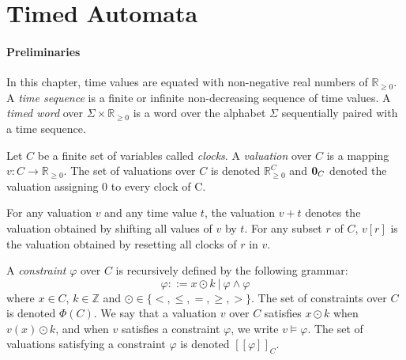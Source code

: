 \documentclass[11pt]{article}
\theoremstyle{definition}
\theoremstyle{remark}
\theoremstyle{definition}
\begin{document}
\section{Timed Automata}\label{sec:ta}
\paragraph{Preliminaries}\label{par:prelims}
In this chapter, time values are equated with non-negative real numbers of $\mathbb{R}_{\geq 0}$. A \emph{time sequence} is a finite or infinite non-decreasing sequence of time values.
A \emph{timed word} over $\Sigma \times \mathbb{R}_{\geq 0}$ is a word over the alphabet $\Sigma$ sequentially paired with a time sequence.

Let $C$ be a finite set of variables called \emph{clocks}. A \emph{valuation} over $C$ is a mapping $v \colon C \to \mathbb{R}_{\geq 0}$. The set of valuations over $C$ is denoted $\mathbb{R}_{\geq 0}^C$ and $\text{\bf 0}_C$ denoted the valuation assigning 0 to every clock of C.

For any valuation $v$ and any time value $t$, the valuation $v + t$ denotes the valuation obtained by shifting all values of $v$ by $t$. For any subset $r$ of $C$, $v[r]$ is the valuation obtained by resetting all clocks of $r$ in $v$.

A \emph{constraint} $\varphi$ over $C$ is recursively defined by the following grammar:
\begin{equation*}
	\varphi ::= x \odot k\ |\ \varphi \land \varphi
\end{equation*}
where $x\in C$, $k \in \mathbb{Z}$ and $\odot \in \{<, \leq, =, \geq, >\}$.
The set of constraints over $C$ is denoted $\Phi(C)$.
We say that a valuation $v$ over $C$ satisfies $x \odot k$ when $v(x) \odot k$, and when $v$ satisfies a constraint $\varphi$, we write $v \models \varphi$. The set of valuations satisfying a constraint $\varphi$ is denoted $[\![\varphi]\!]_C$.

\end{document}
